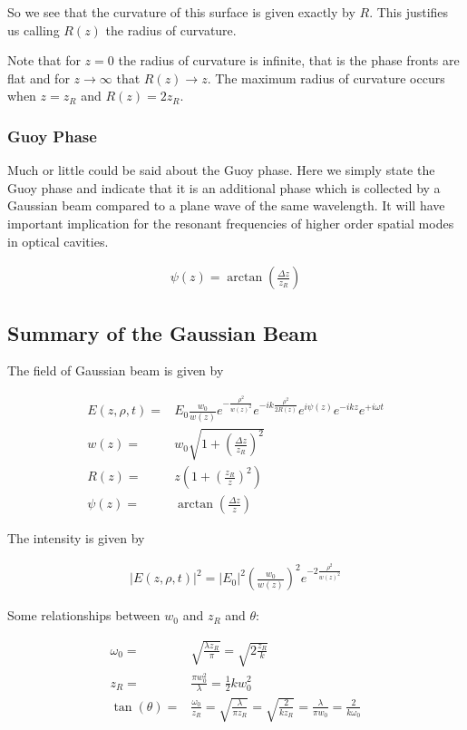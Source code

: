 \documentclass[12pt]{article}
\begin{document}
So we see that the curvature of this surface is given exactly by $R$.
This justifies us calling $R(z)$ the radius of curvature.

Note that for $z = 0$ the radius of curvature is infinite, that is the phase fronts are flat and for $z\rightarrow \infty$ that $R(z)\rightarrow z$.
The maximum radius of curvature occurs when $z=z_R$ and $R(z) = 2 z_R$.

\subsubsection{Guoy Phase}

Much or little could be said about the Guoy phase.
Here we simply state the Guoy phase and indicate that it is an additional phase which is collected by a Gaussian beam compared to a plane wave of the same wavelength.
It will have important implication for the resonant frequencies of higher order spatial modes in optical cavities.

\begin{align}
\psi(z) = \arctan\left(\frac{\Delta z}{z_R}\right)
\end{align}

\subsection{Summary of the Gaussian Beam}

The field of Gaussian beam is given by

\begin{align}
E(z, \rho, t) =& E_0 \frac{w_0}{w(z)} e^{-\frac{\rho^2}{w(z)^2}} e^{-ik\frac{\rho^2}{2R(z)}} e^{i\psi(z)} e^{-ikz} e^{+i\omega t}\\
w(z) =& w_0\sqrt{1+\left(\frac{\Delta z}{z_R}\right)^2}\\
R(z) =& z\left(1+\left(\frac{z_R}{z}\right)^2\right)\\
\psi(z) =& \arctan\left(\frac{\Delta z}{z}\right)
\end{align}

The intensity is given by

\begin{align}
|E(z, \rho, t)|^2 = |E_0|^2 \left(\frac{w_0}{w(z)}\right)^2 e^{-2\frac{\rho^2}{w(z)^2}}
\end{align}

Some relationships between $w_0$ and $z_R$ and $\theta$:

\begin{align}
\omega_0 =& \sqrt{\frac{\lambda z_R}{\pi}} = \sqrt{2 \frac{z_R}{k}}\\
z_R =& \frac{\pi w_0^2}{\lambda} = \frac{1}{2} k w_0^2\\
\tan(\theta) =& \frac{\omega_0}{z_R} = \sqrt{\frac{\lambda}{\pi z_R}} = \sqrt{\frac{2}{k z_R}} = \frac{\lambda}{\pi w_0} = \frac{2}{k\omega_0}
\end{align}
\end{document}
